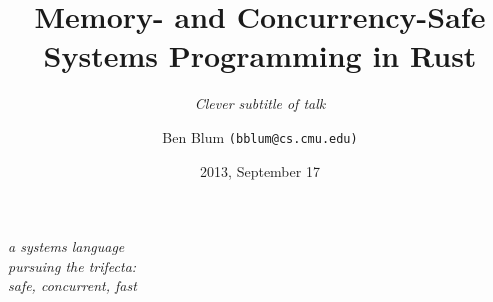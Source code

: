 \documentclass[xcolor=dvipsnames]{beamer}
\title[Rust]{{\bf Memory- and Concurrency-Safe Systems Programming in Rust}}
\subtitle[]{ {\em Clever subtitle of talk}}
\author[Ben Blum]{Ben Blum \texttt{(bblum@cs.cmu.edu)}}
\institute[Mozilla Research]{Mozilla Research}
\date[]{2013, September 17}
\begin{document}
\normalem
\begin{frame}
	\titlepage
\end{frame}


\newcommand\linegap{\vspace{0.2in}}
\newcommand\breakslide[1]{\begin{frame}{} \begin{center} \Large #1 \end{center} \end{frame}}
\newcommand\related[1]{\textsuperscript{\em [#1]}}
\newcommand\hilight[2]{\color{#1}#2\color{black}}

\begin{frame}{}
	\begin{center}
		{\em a systems language} \\
		{\em pursuing the trifecta:} \\
		{\em safe, concurrent, fast}
	\end{center}
\end{frame}
\end{document}
